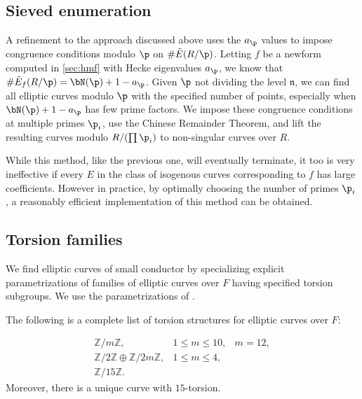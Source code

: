 \documentclass{amsart}
\newcommand{\n}{\mathfrak{n}}
\begin{document}
\subsection{Sieved enumeration}\label{sec:sieve}

A refinement to the approach discussed above uses the $a_\p$ values to impose
congruence conditions modulo $\p$ on $\#\tilde E(R/\p)$.
Letting $f$ be a newform computed in \ref{sec:hmf} with Hecke eigenvalues
$a_\p$, we know that $\#\tilde E_f(R/\p)=\bN(\p)+1-a_{\p}$.
Given $\p$ not dividing the level $\n$, we can find all elliptic curves
modulo $\p$ with the specified number of points, especially when $\bN(\p) +1 - a_\p$ has
few prime factors. We impose these congruence conditions at multiple primes $\p_i$,
use the Chinese Remainder Theorem, and lift the resulting curves modulo $R/ (\prod \p_i)$
to non-singular curves over $R$.

While this method, like the previous one, will eventually terminate, it too is very
ineffective if every $E$ in the class of isogenous curves corresponding to $f$ has
large coefficients. However in practice, by optimally choosing the number of primes $\p_i$, 
a reasonably efficient implementation of this method can be obtained.

\subsection{Torsion families}\label{sec:torsion}

We find elliptic curves of small conductor by specializing explicit parametrizations
of families of elliptic curves over $F$ having specified torsion subgroups.
We use the parametrizations of \cite{kubert:torfam}.

\begin{theorem} The following is
a complete list of torsion structures for elliptic curves over $F$:

$$\begin{array}{lll}
\mathbb{Z}/m\mathbb{Z},   &1 \leq m \leq 10,& m = 12,\\
\mathbb{Z}/2\mathbb{Z} \oplus \mathbb{Z}/2m\mathbb{Z}, &  1 \leq m \leq 4,&\\
\mathbb{Z}/15\mathbb{Z}.&&
\end{array}$$ 
Moreover, there is a unique curve with $15$-torsion.
\end{theorem}
\end{document}
